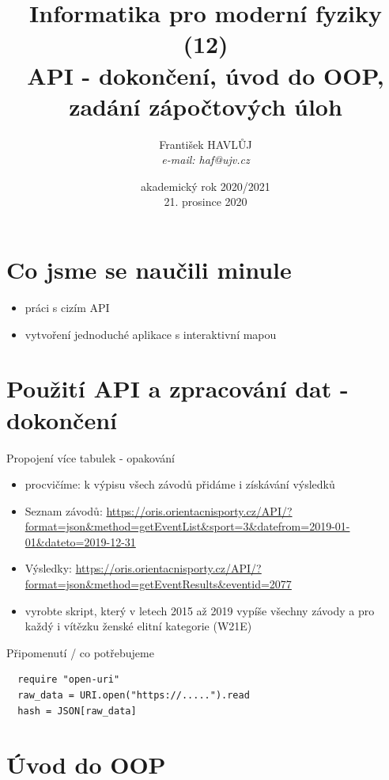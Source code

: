 \documentclass{beamer}
\title[IMF (12)]{Informatika pro moderní fyziky (12)\\ API - dokončení, úvod do OOP, zadání zápočtových úloh}
\author[Franti\v{s}ek HAVL\r{U}J, ORF ÚJV Řež]{Franti\v{s}ek HAVL\r{U}J\\{\scriptsize \emph{e-mail: haf@ujv.cz}}}
\date{akademický rok 2020/2021\\21. prosince 2020}
\institute[ORF ÚJV Řež]
{ÚJV Řež\\oddělení Reaktorové fyziky a podpory palivového cyklu}
\begin{document}
\begin{frame}
  \titlepage
\end{frame}

\begin{frame}
  \tableofcontents
\end{frame}

\section{Co jsme se naučili minule}

\begin{frame}{}
  \begin{itemize}
    \item práci s cizím API
    \item vytvoření jednoduché aplikace s interaktivní mapou
  \end{itemize}
\end{frame}


\section{Použití API a zpracování dat - dokončení}

\begin{frame}{Propojení více tabulek - opakování}
  \begin{itemize}
    \item procvičíme: k výpisu všech závodů přidáme i získávání výsledků
    \item Seznam závodů: \url{https://oris.orientacnisporty.cz/API/?format=json\&method=getEventList\&sport=3\&datefrom=2019-01-01\&dateto=2019-12-31}
    \item Výsledky: \url{https://oris.orientacnisporty.cz/API/?format=json&method=getEventResults&eventid=2077}
    \item vyrobte skript, který v letech 2015 až 2019 vypíše všechny závody a pro každý i vítězku ženské elitní kategorie (W21E)
  \end{itemize}
\end{frame}

\begin{frame}[fragile]{Připomenutí / co potřebujeme}
\begin{verbatim}
  require "open-uri"
  raw_data = URI.open("https://.....").read
  hash = JSON[raw_data]
\end{verbatim}
\end{frame}


\section{Úvod do OOP}
\end{document}
